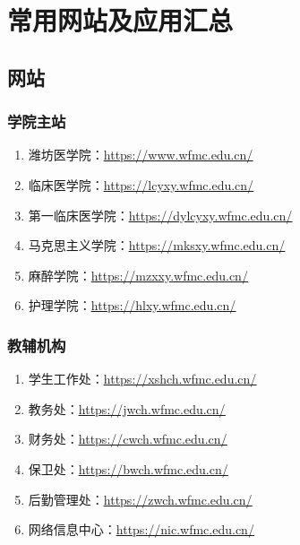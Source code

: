 \chapter[常用网站及应用汇总]{常用网站及应用汇总\vspace{-1em}}
\section[网站]{网站\vspace{-0.5em}}
\subsection[学院主站]{学院主站}
\begin{enumerate}
    \item 潍坊医学院：\uline{\href{https://www.wfmc.edu.cn/}{https://www.wfmc.edu.cn/}}
    \item 临床医学院：\uline{\href{https://lcyxy.wfmc.edu.cn/}{https://lcyxy.wfmc.edu.cn/}}
    \item 第一临床医学院：\uline{\href{https://dylcyxy.wfmc.edu.cn/}{https://dylcyxy.wfmc.edu.cn/}}
    \item 马克思主义学院：\uline{\href{https://mksxy.wfmc.edu.cn/}{https://mksxy.wfmc.edu.cn/}}
    \item 麻醉学院：\uline{\href{https://mzxxy.wfmc.edu.cn/}{https://mzxxy.wfmc.edu.cn/}}
    \item 护理学院：\uline{\href{https://hlxy.wfmc.edu.cn/}{https://hlxy.wfmc.edu.cn/}}
\end{enumerate}

\subsection[教辅机构]{教辅机构}
\begin{enumerate}
    \item 学生工作处：\uline{\href{https://xshch.wfmc.edu.cn/}{https://xshch.wfmc.edu.cn/}}
    \item 教务处：\uline{\href{https://jwch.wfmc.edu.cn/}{https://jwch.wfmc.edu.cn/}}
    \item 财务处：\uline{\href{https://cwch.wfmc.edu.cn/}{https://cwch.wfmc.edu.cn/}}
    \item 保卫处：\uline{\href{https://bwch.wfmc.edu.cn/}{https://bwch.wfmc.edu.cn/}}
    \item 后勤管理处：\uline{\href{https://zwch.wfmc.edu.cn/}{https://zwch.wfmc.edu.cn/}}
    \item 网络信息中心：\uline{\href{https://nic.wfmc.edu.cn/}{https://nic.wfmc.edu.cn/}}
\end{enumerate}

